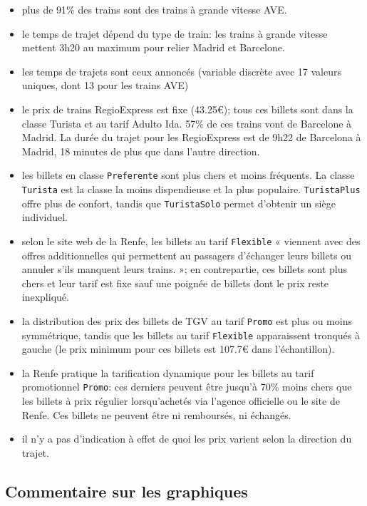 \documentclass[
  11pt,
  letterpaper,
]{scrbook}
\providecommand{\tightlist}{%
  \setlength{\itemsep}{0pt}\setlength{\parskip}{0pt}}\usepackage{longtable,booktabs,array}
\theoremstyle{definition}
\theoremstyle{remark}
\begin{document}
\begin{itemize}
\tightlist
\item
  plus de 91\% des trains sont des trains à grande vitesse AVE.
\item
  le temps de trajet dépend du type de train: les trains à grande
  vitesse mettent 3h20 au maximum pour relier Madrid et Barcelone.
\item
  les temps de trajets sont ceux annoncés (variable discrète avec 17
  valeurs uniques, dont 13 pour les trains AVE)
\item
  le prix de trains RegioExpress est fixe (43.25€); tous ces billets
  sont dans la classe Turista et au tarif Adulto Ida. 57\% de ces trains
  vont de Barcelone à Madrid. La durée du trajet pour les RegioExpress
  est de 9h22 de Barcelona à Madrid, 18 minutes de plus que dans l'autre
  direction.
\item
  les billets en classe \texttt{Preferente} sont plus chers et moins
  fréquents. La classe \texttt{Turista} est la classe la moins
  dispendieuse et la plus populaire. \texttt{TuristaPlus} offre plus de
  confort, tandis que \texttt{TuristaSolo} permet d'obtenir un siège
  individuel.
\item
  selon le site web de la Renfe, les billets au tarif \texttt{Flexible}
  « viennent avec des offres additionnelles qui permettent au passagers
  d'échanger leurs billets ou annuler s'ils manquent leurs trains. »; en
  contrepartie, ces billets sont plus chers et leur tarif est fixe sauf
  une poignée de billets dont le prix reste inexpliqué.
\item
  la distribution des prix des billets de TGV au tarif \texttt{Promo}
  est plus ou moins symmétrique, tandis que les billets au tarif
  \texttt{Flexible} apparaissent tronqués à gauche (le prix minimum pour
  ces billets est 107.7€ dans l'échantillon).
\item
  la Renfe pratique la tarification dynamique pour les billets au tarif
  promotionnel \texttt{Promo}: ces derniers peuvent être jusqu'à 70\%
  moins chers que les billets à prix régulier lorsqu'achetés via
  l'agence officielle ou le site de Renfe. Ces billets ne peuvent être
  ni remboursés, ni échangés.
\item
  il n'y a pas d'indication à effet de quoi les prix varient selon la
  direction du trajet.
\end{itemize}

\subsection{Commentaire sur les
graphiques}\label{commentaire-sur-les-graphiques}
\end{document}

